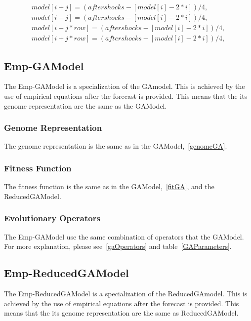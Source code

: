 \begin{subequations}
\begin{align}
        model[i+j] = (aftershocks-[model[i]-2*i])/4,\\
        model[i-j] = (aftershocks-[model[i]-2*i])/4,\\
        model[i-j*row] = (aftershocks-[model[i]-2*i])/4,\\
        model[i+j*row] = (aftershocks-[model[i]-2*i])/4,
\end{align}
\end{subequations}

\subsection{Emp-GAModel}
The Emp-GAModel is a specialization of the GAmodel. This is achieved by the use of empirical equations after the forecast is provided. This means that the its genome representation are the same as the GAModel.\\
\subsubsection{Genome Representation}
The genome representation is the same as in the GAModel,~\ref{genomeGA}.\\

\subsubsection{Fitness Function}
The fitness function is the same as in the GAModel,~\ref{fitGA}, and the ReducedGAModel.\\
\subsubsection{Evolutionary Operators}
The Emp-GAModel use the same combination of operators that the GAModel. For more explanation, please see~\ref{gaOperators} and table~\ref{GAParameters}.\\

\subsection{Emp-ReducedGAModel}
The Emp-ReducedGAModel is a specialization of the ReducedGAmodel. This is achieved by the use of empirical equations after the forecast is provided. This means that the its genome representation are the same as ReducedGAModel.\\

